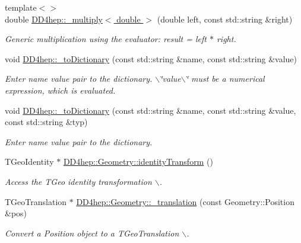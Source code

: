 \begin{DoxyCompactItemize}
{\footnotesize template$<$$>$ }\\double \hyperlink{group___d_d4_h_e_p___g_e_o_m_e_t_r_y_ga7e18f8eea60e0bad68cccbc5fb890bea}{DD4hep::\_\-multiply$<$ double $>$} (double left, const std::string \&right)
\begin{DoxyCompactList}\small\item\em Generic multiplication using the evaluator: result = left $\ast$ right. \item\end{DoxyCompactList}\item 
void \hyperlink{group___d_d4_h_e_p___g_e_o_m_e_t_r_y_gaaf303de968d2679957961df3928767c1}{DD4hep::\_\-toDictionary} (const std::string \&name, const std::string \&value)
\begin{DoxyCompactList}\small\item\em Enter name value pair to the dictionary. $\backslash$\char`\"{}value$\backslash$\char`\"{} must be a numerical expression, which is evaluated. \item\end{DoxyCompactList}\item 
void \hyperlink{group___d_d4_h_e_p___g_e_o_m_e_t_r_y_gae255c713c9960e1779d1f16bb16b1d63}{DD4hep::\_\-toDictionary} (const std::string \&name, const std::string \&value, const std::string \&typ)
\begin{DoxyCompactList}\small\item\em Enter name value pair to the dictionary. \item\end{DoxyCompactList}\item 
TGeoIdentity $\ast$ \hyperlink{group___d_d4_h_e_p___g_e_o_m_e_t_r_y_gacb7266110e19d4dda6cc6b2ebc57bd39}{DD4hep::Geometry::identityTransform} ()
\begin{DoxyCompactList}\small\item\em Access the TGeo identity transformation $\backslash$. \item\end{DoxyCompactList}\item 
TGeoTranslation $\ast$ \hyperlink{group___d_d4_h_e_p___g_e_o_m_e_t_r_y_ga2a9c214ef0a2444cccf194669fe81771}{DD4hep::Geometry::\_\-translation} (const Geometry::Position \&pos)
\begin{DoxyCompactList}\small\item\em Convert a Position object to a TGeoTranslation $\backslash$. \item\end{DoxyCompactList}\item 

\end{DoxyCompactItemize}
